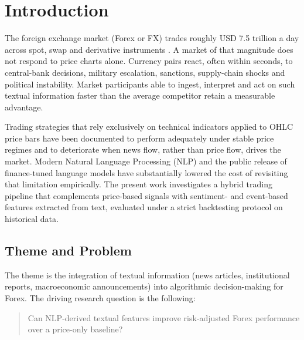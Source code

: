 \chapter{Introduction} \label{cap:introduction}

The foreign exchange market (Forex or FX) trades roughly USD 7.5 trillion a day across spot, swap and derivative instruments \cite{bis2022triennial}. A market of that magnitude does not respond to price charts alone. Currency pairs react, often within seconds, to central-bank decisions, military escalation, sanctions, supply-chain shocks and political instability. Market participants able to ingest, interpret and act on such textual information faster than the average competitor retain a measurable advantage.

Trading strategies that rely exclusively on technical indicators applied to OHLC price bars \cite{murphy1999technical} have been documented to perform adequately under stable price regimes and to deteriorate when news flow, rather than price flow, drives the market. Modern Natural Language Processing (NLP) and the public release of finance-tuned language models \cite{araci2019finbert,yang2020finbert,wu2023bloomberggpt,liu2023fingpt} have substantially lowered the cost of revisiting that limitation empirically. The present work investigates a hybrid trading pipeline that complements price-based signals with sentiment- and event-based features extracted from text, evaluated under a strict backtesting protocol on historical data.

\section{Theme and Problem} \label{sec:theme-problem}

The theme is the integration of textual information (news articles, institutional reports, macroeconomic announcements) into algorithmic decision-making for Forex. The driving research question is the following:

\begin{quote}
Can NLP-derived textual features improve risk-adjusted Forex performance over a price-only baseline?
\end{quote}

